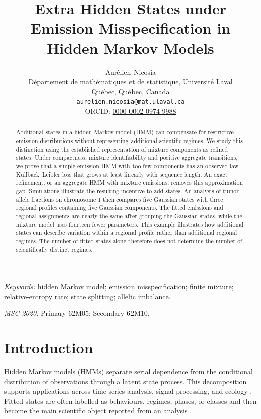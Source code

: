 \documentclass[11pt]{article}
\title{Extra Hidden States under Emission Misspecification in Hidden Markov Models}
\author{Aur\'elien Nicosia\\
D\'epartement de math\'ematiques et de statistique, Universit\'e Laval\\
Qu\'ebec, Qu\'ebec, Canada\\
\texttt{aurelien.nicosia@mat.ulaval.ca}\\
ORCID: \href{https://orcid.org/0000-0002-0974-9988}{0000-0002-0974-9988}}
\date{}
\theoremstyle{definition}
\begin{document}
\maketitle
\ifdefined\showlinenumbers\linenumbers\fi

\begin{abstract}
Additional states in a hidden Markov model (HMM) can compensate for restrictive emission
distributions without representing additional scientific regimes. We study
this distinction using the established representation of mixture components
as refined states. Under compactness, mixture identifiability and positive
aggregate transitions, we prove that a simple-emission HMM with too few
components has an observed-law Kullback--Leibler loss that grows at least
linearly with sequence length. An exact refinement, or an aggregate HMM
with mixture emissions, removes this approximation gap. Simulations
illustrate the resulting incentive to add states. An analysis of tumor
allele fractions on chromosome 1 then compares five Gaussian states with
three regional profiles containing five Gaussian components. The fitted
emissions and regional assignments are nearly the same after grouping the
Gaussian states, while the mixture model uses fourteen fewer parameters.
This example illustrates how additional states can describe variation
within a regional profile rather than additional regional regimes. The
number of fitted states alone therefore does not determine the number of
scientifically distinct regimes.

\end{abstract}

\noindent\textit{Keywords:} hidden Markov model; emission misspecification;
finite mixture; relative-entropy rate; state splitting; allelic imbalance.

\medskip
\noindent\textit{MSC 2020:} Primary 62M05; Secondary 62M10.

\section{Introduction}\label{sec:introduction}

Hidden Markov models (HMMs) separate serial dependence from the conditional
distribution of observations through a latent state process. This decomposition
supports applications across time-series analysis, signal processing, and
ecology \citep{Rabiner1989,CappeEtAl2005,ZucchiniEtAl2016}. Fitted states are
often labelled as behaviours, regimes, phases, or classes and then become the
main scientific object reported from an analysis \citep{McClintockEtAl2020}.
\end{document}
